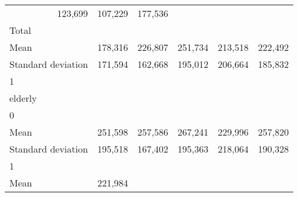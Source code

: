\begin{tabular}{llllll}
  \multicolumn{1}{r}{123,699} &
  \multicolumn{1}{r}{107,229} &
  \multicolumn{1}{r}{177,536} \\
\multicolumn{1}{l}{\hspace{3em}Total} &
  \multicolumn{1}{|r}{} &
  \multicolumn{1}{r}{} &
  \multicolumn{1}{r}{} &
  \multicolumn{1}{r}{} &
  \multicolumn{1}{r}{} \\
\multicolumn{1}{l}{\hspace{4em}Mean} &
  \multicolumn{1}{|r}{178,316} &
  \multicolumn{1}{r}{226,807} &
  \multicolumn{1}{r}{251,734} &
  \multicolumn{1}{r}{213,518} &
  \multicolumn{1}{r}{222,492} \\
\multicolumn{1}{l}{\hspace{4em}Standard deviation} &
  \multicolumn{1}{|r}{171,594} &
  \multicolumn{1}{r}{162,668} &
  \multicolumn{1}{r}{195,012} &
  \multicolumn{1}{r}{206,664} &
  \multicolumn{1}{r}{185,832} \\
\multicolumn{1}{l}{\hspace{1em}1} &
  \multicolumn{1}{|r}{} &
  \multicolumn{1}{r}{} &
  \multicolumn{1}{r}{} &
  \multicolumn{1}{r}{} &
  \multicolumn{1}{r}{} \\
\multicolumn{1}{l}{\hspace{2em}elderly} &
  \multicolumn{1}{|r}{} &
  \multicolumn{1}{r}{} &
  \multicolumn{1}{r}{} &
  \multicolumn{1}{r}{} &
  \multicolumn{1}{r}{} \\
\multicolumn{1}{l}{\hspace{3em}0} &
  \multicolumn{1}{|r}{} &
  \multicolumn{1}{r}{} &
  \multicolumn{1}{r}{} &
  \multicolumn{1}{r}{} &
  \multicolumn{1}{r}{} \\
\multicolumn{1}{l}{\hspace{4em}Mean} &
  \multicolumn{1}{|r}{251,598} &
  \multicolumn{1}{r}{257,586} &
  \multicolumn{1}{r}{267,241} &
  \multicolumn{1}{r}{229,996} &
  \multicolumn{1}{r}{257,820} \\
\multicolumn{1}{l}{\hspace{4em}Standard deviation} &
  \multicolumn{1}{|r}{195,518} &
  \multicolumn{1}{r}{167,402} &
  \multicolumn{1}{r}{195,363} &
  \multicolumn{1}{r}{218,064} &
  \multicolumn{1}{r}{190,328} \\
\multicolumn{1}{l}{\hspace{3em}1} &
  \multicolumn{1}{|r}{} &
  \multicolumn{1}{r}{} &
  \multicolumn{1}{r}{} &
  \multicolumn{1}{r}{} &
  \multicolumn{1}{r}{} \\
\multicolumn{1}{l}{\hspace{4em}Mean} &
  \multicolumn{1}{|r}{221,984} &

\end{tabular}
